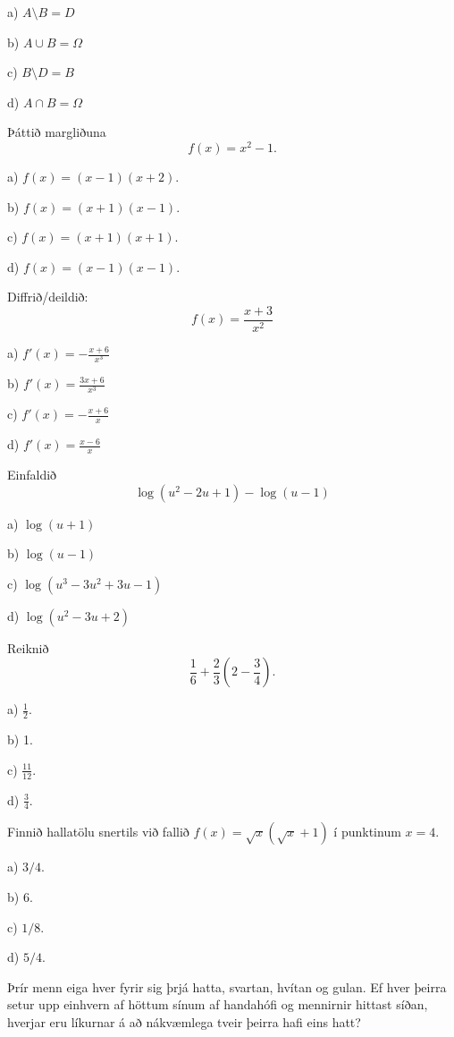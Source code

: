 a) $A\setminus B=D$

b) $A\cup B=\Omega$ %

c) $B\setminus D=B $

d) $A\cap B=\Omega$


\item Þáttið margliðuna $$f(x) = x^2 -1.$$

a) $f(x) = (x-1)(x+2)$.

b) $f(x) = (x+1)(x-1)$. %

c) $f(x) = (x+1)(x+1)$.

d) $f(x) = (x-1)(x-1)$.


\item Diffrið/deildið: $$f(x)=\frac{x+3}{x^2}$$

a) \hspace{2mm} $\displaystyle f'(x)=-\frac{x+6}{x^3}$ %

b) \hspace{2mm} $\displaystyle f'(x)=\frac{3x+6}{x^3}$

c) \hspace{2mm} $\displaystyle f'(x)=-\frac{x+6}{x}$

d) \hspace{2mm} $\displaystyle f'(x)=\frac{x-6}{x}$


\item Einfaldið
$$\log(u^2-2u+1)-\log(u-1)$$

a) $\log(u+1)$

b) $\log(u-1)$ %

c) $\log(u^3-3u^2+3u-1)$

d) $\log(u^2-3u+2)$


\item Reiknið
\[
\frac{1}{6} + \frac{2}{3} \left( 2 - \frac{3}{4} \right).
\]

a) $ \frac{1}{2}$.

b) 1. %

c) $ \frac{11}{12}$.

d) $ \frac{3}{4}$.


\item Finnið hallatölu snertils við fallið $f(x) = \sqrt x
\left( \sqrt{x} + 1\right)$ í punktinum $x=4$.

a) $3/4$.

b) $6$.

c) $1/8$.

d) $5/4$. %


\item Þrír menn eiga hver fyrir sig þrjá hatta, svartan, hvítan og gulan. Ef hver þeirra setur upp einhvern af höttum sínum af handahófi og mennirnir hittast síðan, hverjar eru líkurnar á að nákvæmlega tveir þeirra hafi eins hatt?

